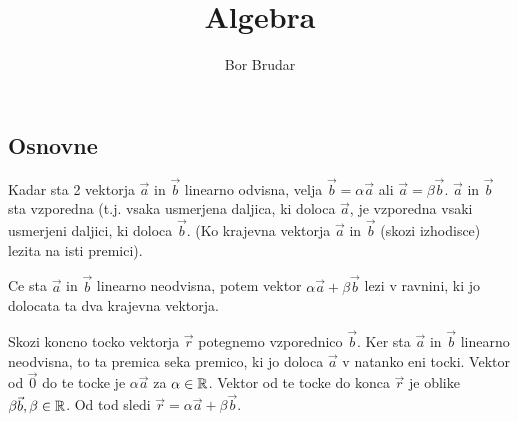 \documentclass{report}
\title{\Huge{Algebra}}
\author{Bor Brudar}
\date{}
\begin{document}
\maketitle
\newpage%
\tableofcontents
\pagebreak


\chapter{}
\section{Osnovne}




Kadar sta 2 vektorja $\vec{a}$ in $\vec{b}$ linearno odvisna, velja $\vec{b} = \alpha \vec{a}$ ali $\vec{a} = \beta \vec{b}$. $\vec{a}$ in $\vec{b}$ sta vzporedna (t.j. vsaka usmerjena daljica, ki doloca $\vec{a}$, je vzporedna vsaki usmerjeni daljici, ki doloca $\vec{b}$. (Ko krajevna vektorja $\vec{a}$ in $\vec{b}$ (skozi izhodisce) lezita na isti premici).


Ce sta $\vec{a}$ in $\vec{b}$ linearno neodvisna, potem vektor $\alpha \vec{a} + \beta \vec{b}$ lezi v ravnini, ki jo dolocata ta dva krajevna vektorja.


\sol Skozi koncno tocko vektorja $\vec{r}$ potegnemo vzporednico $\vec{b}$. Ker sta $\vec{a}$ in $\vec{b}$ linearno neodvisna, to ta premica seka premico, ki jo doloca $\vec{a}$ v natanko eni tocki. Vektor od $\vec{0}$ do te tocke je $\alpha \vec{a}$ za $\alpha \in \mathbb{R}$. Vektor od te tocke do konca $\vec{r}$ je oblike $ \beta \vec{b} ,\beta \in \mathbb{R}$. Od tod sledi $\vec{r} = \alpha \vec{a} + \beta \vec{b}$.
\end{document}
